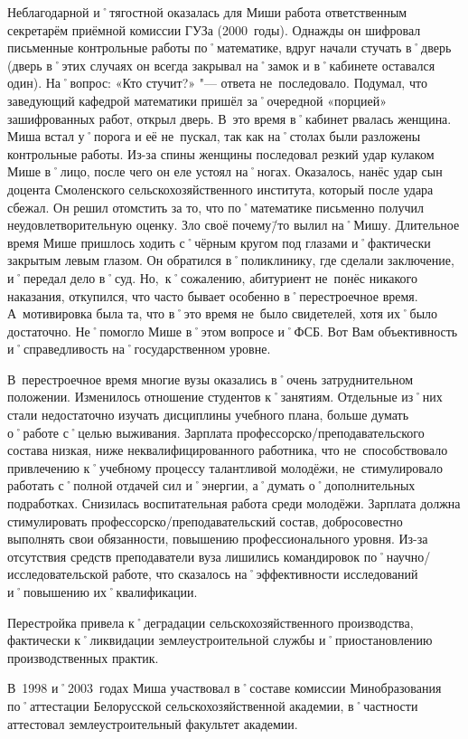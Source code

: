 Неблагодарной и˚тягостной оказалась для Миши работа ответственным секретарём приёмной комиссии ГУЗа (2000~годы). Однажды он шифровал письменные контрольные работы по˚математике, вдруг начали стучать в˚дверь (дверь в˚этих случаях он всегда закрывал на˚замок и в˚кабинете оставался один). На˚вопрос: «Кто стучит?» "--- ответа не~последовало. Подумал, что заведующий кафедрой математики пришёл за˚очередной «порцией» зашифрованных работ, открыл дверь. В~это время в˚кабинет рвалась женщина. Миша встал у˚порога и её не~пускал, так как на˚столах были разложены контрольные работы. Из-за спины женщины последовал резкий удар кулаком Мише в˚лицо, после чего он еле устоял на˚ногах. Оказалось, нанёс удар сын доцента Смоленского сельскохозяйственного института, который после удара сбежал. Он решил отомстить за то, что по˚математике письменно получил неудовлетворительную оценку. Зло своё почему\=/то вылил на˚Мишу. Длительное время Мише пришлось ходить с˚чёрным кругом под глазами и˚фактически закрытым левым глазом. Он обратился в˚поликлинику, где сделали заключение, и˚передал дело в˚суд. Но,~к˚сожалению, абитуриент не~понёс никакого наказания, откупился, что часто бывает особенно в˚перестроечное время. А~мотивировка была та, что в˚это время не~было свидетелей, хотя их˚было достаточно. Не˚помогло Мише в˚этом вопросе и˚ФСБ. Вот Вам объективность и˚справедливость на˚государственном уровне.

В~перестроечное время многие вузы оказались в˚очень затруднительном положении. Изменилось отношение студентов к˚занятиям. Отдельные из˚них стали недостаточно изучать дисциплины учебного плана, больше думать о˚работе с˚целью выживания. Зарплата профессорско\-/преподавательского состава низкая, ниже неквалифицированного работника, что не~способствовало привлечению к˚учебному процессу талантливой молодёжи, не~стимулировало работать с˚полной отдачей сил и˚энергии, а˚думать о˚дополнительных подработках. Снизилась воспитательная работа среди молодёжи. Зарплата должна стимулировать профессорско\-/преподавательский состав, добросовестно выполнять свои обязанности, повышению профессионального уровня. Из-за отсутствия средств преподаватели вуза лишились командировок по˚научно\-/исследовательской работе, что сказалось на˚эффективности исследований и˚повышению их˚квалификации. 

Перестройка привела к˚деградации сельскохозяйственного производства, фактически к˚ликвидации землеустроительной службы и˚приостановлению производственных практик. 

В~1998 и˚2003~годах Миша участвовал в˚составе комиссии Минобразования по˚аттестации Белорусской сельскохозяйственной академии, в˚частности аттестовал землеустроительный факультет академии. 

